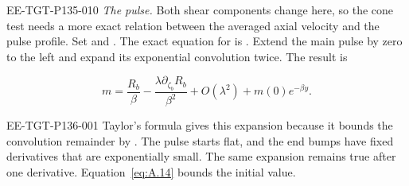\begin{EESegment}{EE-TGT-P135-010}
\emph{The pulse.} Both shear components change here, so the cone test needs a more exact relation between the averaged
axial velocity and the pulse profile. Set  and
. The exact equation for  is
. Extend the main pulse by zero to the left and expand its exponential convolution
twice. The result is
\end{EESegment}
\begin{equation}
 m=\frac{R_b}{\beta}-\frac{\lambda\partial_{\zeta_b}R_b}{\beta^2}
   +O(\lambda^2)+m(0)e^{-\beta y}.
 \tag{A.28}\label{eq:A.28}
\end{equation}
%
\begin{EESegment}{EE-TGT-P136-001}
Taylor's formula gives this expansion because it bounds the convolution remainder by
. The pulse starts flat, and the end bumps have fixed
 derivatives that are exponentially small. The same expansion remains true after one
 derivative. Equation~\eqref{eq:A.14} bounds the initial value.
\end{EESegment}

